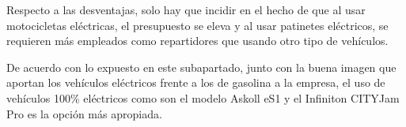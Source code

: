 Respecto a las desventajas, solo hay que incidir en el hecho de que al usar motocicletas eléctricas, el presupuesto se eleva y al usar patinetes eléctricos, se requieren más empleados como repartidores que usando otro tipo de vehículos.

De acuerdo con lo expuesto en este subapartado, junto con la buena imagen que aportan los vehículos eléctricos frente a los de gasolina a la empresa, el uso de vehículos 100\% eléctricos como son el modelo Askoll eS1 y el Infiniton CITYJam Pro es la opción más apropiada.
